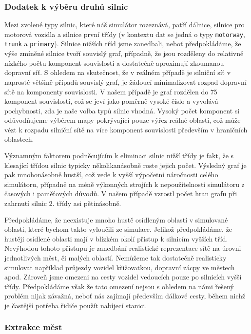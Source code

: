 \subsubsection{Dodatek k výběru druhů silnic}
Mezi zvolené typy silnic, které náš simulátor rozeznává, patří 
dálnice, silnice pro motorová vozidla a silnice první třídy (v kontextu
dat se jedná o typy \texttt{motorway}, \texttt{trunk} a \texttt{primary}).
Silnice nižších tříd jsme zanedbali, neboť předpokládáme, že výše zmíněné 
silnice tvoří souvislý graf, případně, že jsou rozděleny do relativně nízkého 
počtu komponent souvislosti a dostatečně aproximují zkoumanou dopravní síť.
S ohledem na skutečnost, že v reálném případě je silniční síť v naprosté většině
případů souvislý graf, je žádoucí minimalizovat rozpad dopravní sítě na 
komponenty souvislosti. V našem případě je graf rozdělen do 75 komponent 
souvislosti, což se jeví jako poměrně vysoké číslo a vyvolává pochybnosti,
zda je naše volba typů silnic vhodná. Vysoký počet komponent si odůvodňujeme
výběrem mapy pokrývající pouze výřez reálné oblasti, což může vézt k rozpadu
silniční sítě na více komponent souvislosti především v hraničních oblastech.

Významným faktorem podněcujícím k eliminaci silnic nižší třídy je fakt, že
s klesající třídou silnic typicky několikanásobně roste jejich počet. Výsledný
graf je pak mnohonásobně hustší, což vede k vyšší výpočetní náročnosti celého
simulátoru, případně na méně výkonných strojích k nepoužitelnosti simulátoru
z časových i paměťových důvodů. V našem případě vzrostl počet hran grafu při
zahrnutí silnic 2. třídy asi pětinásobně. 

Předpokládáme, že neexistuje mnoho hustě osídleným oblastí v simulované oblasti,
které bychom takto vyloučili ze simulace. Jelikož předpokládáme, že hustěji
osídlené oblasti mají v blízkém okolí přístup k silnicím vyšších tříd. 
Nevýhodou tohoto přístupu je zanedbání realistické reprezentace sítě na úrovni
jednotlivých měst, či malých oblastí. Nemůžeme tak dostatečně realisticky 
simulovat například průjezdy vozidel křižovatkou, dopravní zácpy ve městech apod.
Zároveň jsme omezeni na cesty vozidel vedoucích pouze po silnicích vyšší třídy. 
Předpokládáme však že tato omezení nejsou s ohledem
na námi řešený problém nijak závažná, neboť nás zajímají především dálkové 
cesty, během nichž je častější potřeba řidiče použít nabíjecí stanici.


\subsubsection{Extrakce měst}

